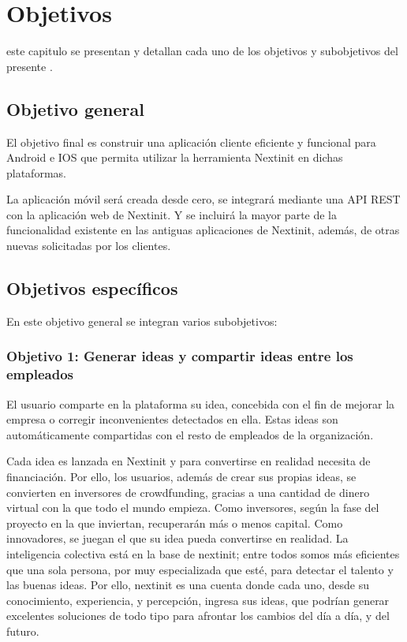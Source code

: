 \chapter{Objetivos}
\label{chap:objetivos}

 este capitulo se presentan y detallan cada uno de los objetivos y subobjetivos
del presente .

\section{Objetivo general}

El objetivo final es construir una aplicación cliente eficiente y funcional para Android e IOS
que permita utilizar la herramienta Nextinit en dichas plataformas.

La aplicación móvil será creada desde cero, se integrará mediante una API REST con la aplicación 
web de Nextinit. Y se incluirá la mayor parte de la funcionalidad existente en las antiguas 
aplicaciones de Nextinit, además, de otras nuevas solicitadas por los clientes.


\section{Objetivos específicos}

En este objetivo general se integran varios subobjetivos:

\subsection{Objetivo 1: Generar ideas y compartir ideas entre los empleados}

El usuario comparte en la plataforma su idea, concebida con el fin de mejorar la empresa o corregir 
inconvenientes detectados en ella. Estas ideas son automáticamente compartidas con el resto de empleados
de la organización.

Cada idea es lanzada en Nextinit y para convertirse en realidad necesita de financiación. Por
ello, los usuarios, además de crear sus propias ideas, se convierten en inversores de crowdfunding,
gracias a una cantidad de dinero virtual con la que todo el mundo empieza. Como inversores,
según la fase del proyecto en la que inviertan, recuperarán más o menos capital. Como
innovadores, se juegan el que su idea pueda convertirse en realidad.
La inteligencia colectiva está en la base de nextinit; entre todos somos más eficientes que una
sola persona, por muy especializada que esté, para detectar el talento y las buenas ideas.
Por ello, nextinit es una cuenta donde cada uno, desde su conocimiento, experiencia, y
percepción, ingresa sus ideas, que podrían generar excelentes soluciones de todo tipo para
afrontar los cambios del día a día, y del futuro.


